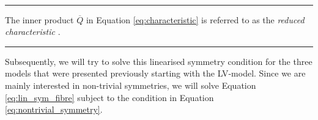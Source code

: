 \dotfill\\
\hrule
\begin{remark}
The inner product $\overline{Q}$ in Equation \eqref{eq:characteristic} is referred to as the \textit{reduced characteristic} \cite{hydon2000symmetry}.
\end{remark}
\hrule
  $\;$\\\noindent
  \noindent $\;$\\Subsequently, we will try to solve this linearised symmetry condition for the three models that were presented previously starting with the LV-model. Since we are mainly interested in non-trivial symmetries, we will solve Equation \eqref{eq:lin_sym_fibre} subject to the condition in Equation \eqref{eq:nontrivial_symmetry}. 



  